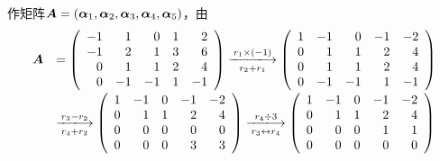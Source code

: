 \begin{frame}
  \begin{jie}
    作矩阵$\boldsymbol{A}=(\boldsymbol{\alpha}_1,\boldsymbol{\alpha}_2,\boldsymbol{\alpha}_3,\boldsymbol{\alpha}_4,\boldsymbol{\alpha}_5)$，由
    $$
    \begin{array}{rl}
      \MA &= \left(
            \begin{array}{rrrrr}
              -1&1&0&1&2\\
              -1&2&1&3&6\\
              0&1&1&2&4\\
              0&-1&-1&1&-1
            \end{array}
                         \right) \xlongrightarrow[r_2+r_1]{ r_1\times(-1)}
                         \left(
                         \begin{array}{rrrrr}
                           1&-1&0&-1&-2\\
                           0&1&1&2&4\\
                           0&1&1&2&4\\
                           0&-1&-1&1&-1
                         \end{array}
                                      \right)\\[0.28in]
          &\xlongrightarrow[r_4+r_2]{r_3- r_2}
            \left(
            \begin{array}{rrrrr}
              1&-1&0&-1&-2\\
              0&1&1&2&4\\
              0&0&0&0&0\\
              0&0&0&3&3
            \end{array}
                       \right) \xlongrightarrow[r_3\leftrightarrow r_4]{r_4\div 3}
                       \left(
                       \begin{array}{rrrrr}
                         1&-1&0&-1&-2\\
                         0&1&1&2&4\\
                         0&0&0&1&1\\
                         0&0&0&0&0
                       \end{array}
                                  \right)
    \end{array}
    $$
  \end{jie}
  
\end{frame}

